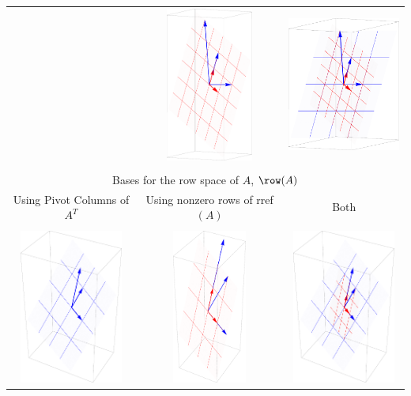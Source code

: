 \begin{table}
\begin{tabular}{ccc}
&\includegraphics[height=2in]{Applications/support/colspace2}
&\includegraphics[height=2in]{Applications/support/colspace3}
\\ \\
\hline\hline \multicolumn{3}{c}{Bases for the row space of $A$, $\row(A)$}\\
\hline Using Pivot Columns of $A^T$ & Using nonzero rows of rref$(A)$ & Both\\ \\
\includegraphics[height=2in]{Applications/support/rowspace1}
&\includegraphics[height=2in]{Applications/support/rowspace2}
&\includegraphics[height=2in]{Applications/support/rowspace3}
\end{tabular}


\end{table}
